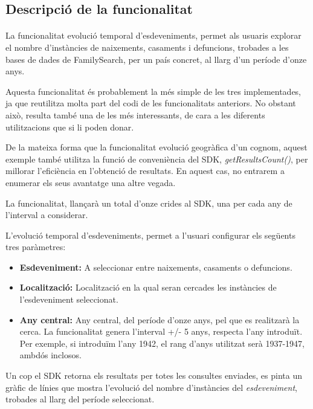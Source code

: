 \subsection{Descripció de la funcionalitat}

\paragraph{}
La funcionalitat evolució temporal d'esdeveniments, permet als usuaris explorar el nombre d'instàncies de naixements, casaments i defuncions, trobades a les bases de dades de FamilySearch, per un país concret, al llarg d'un període d'onze anys.

Aquesta funcionalitat és probablement la més simple de les tres implementades, ja que reutilitza molta part del codi de les funcionalitats anteriors. No obstant això, resulta també una de les més interessants, de cara a les diferents utilitzacions que si li poden donar.

De la mateixa forma que la funcionalitat evolució geogràfica d'un cognom, aquest exemple també utilitza la funció de conveniència del SDK, \emph{getResultsCount()}, per millorar l’eficiència en l’obtenció de resultats. En aquest cas, no entrarem a enumerar els seus avantatge una altre vegada.

La funcionalitat, llançarà un total d’onze crides al SDK, una per cada any de l’interval a considerar.

L'evolució temporal d'esdeveniments, permet a l'usuari configurar els següents tres paràmetres:

\begin{itemize}
    \item \textbf{Esdeveniment:} A seleccionar entre naixements, casaments o defuncions.
    \item \textbf{Localització:} Localització en la qual seran cercades les instàncies de l'esde\-ve\-niment seleccionat.
    \item \textbf{Any central:} Any central, del període d’onze anys, pel que es realitzarà la cerca. La funcionalitat genera l’interval +/- 5 anys, respecta l'any introduït. Per exemple, si introduïm l'any 1942, el rang d'anys utilitzat serà 1937-1947, ambdós inclosos.
\end{itemize}

Un cop el SDK retorna els resultats per totes les consultes enviades, es pinta un gràfic de línies que mostra l'evolució del nombre d'instàncies del \emph{esdeveniment}, trobades al llarg del període seleccionat.

